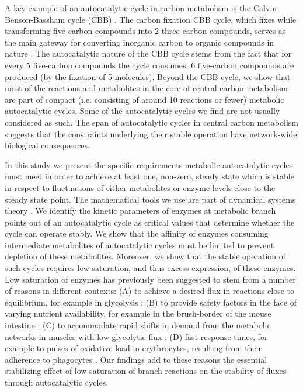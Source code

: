     A key example of an autocatalytic cycle in carbon metabolism is the Calvin-Benson-Bassham cycle (CBB) \cite{Benson1950-cl}.
    The carbon fixation CBB cycle, which fixes  while transforming five-carbon compounds into 2 three-carbon compounds, serves as the main gateway for converting inorganic carbon to organic compounds in nature \cite{Raven2012-le}.
    The autocatalytic nature of the CBB cycle stems from the fact that for every 5 five-carbon compounds the cycle consumes, 6 five-carbon compounds are produced (by the fixation of 5  molecules).
    Beyond the CBB cycle, we show that most of the reactions and metabolites in the core of central carbon metabolism are part of compact (i.e. consisting of around 10 reactions or fewer) metabolic autocatalytic cycles.
    Some of the autocatalytic cycles we find are not usually considered as such.
    The span of autocatalytic cycles in central carbon metabolism suggests that the constraints underlying their stable operation have network-wide biological consequences.

    In this study we present the specific requirements metabolic autocatalytic cycles must meet in order to achieve at least one, non-zero, steady state which is stable in respect to fluctuations of either metabolites or enzyme levels close to the steady state point.
    The mathematical tools we use are part of dynamical systems theory \cite{Strogatz2014-hp}.
    We identify the kinetic parameters of enzymes at metabolic branch points out of an autocatalytic cycle as critical values that determine whether the cycle can operate stably.
    We show that the affinity of enzymes consuming intermediate metabolites of autocatalytic cycles must be limited to prevent depletion of these metabolites.
    Moreover, we show that the stable operation of such cycles requires low saturation, and thus excess expression, of these enzymes.
    Low saturation of enzymes has previously been suggested to stem from a number of reasons in different contexts:
    (A) to achieve a desired flux in reactions close to equilibrium, for example in glycolysis \cite{Staples1997-fq,Eanes2006-gh,Flamholz2013-bb};
    (B) to provide safety factors in the face of varying nutrient availability, for example in the brush-border of the mouse intestine \cite{Weiss1998-gp};
    (C) to accommodate rapid shifts in demand from the metabolic networks in muscles with low glycolytic flux \cite{Suarez1997-jo};
    (D) fast response times, for example to pulses of oxidative load in erythrocytes, resulting from their adherence to phagocytes \cite{Salvador2003-fc}.
    Our findings add to these reasons the essential stabilizing effect of low saturation of branch reactions on the stability of fluxes through autocatalytic cycles.

